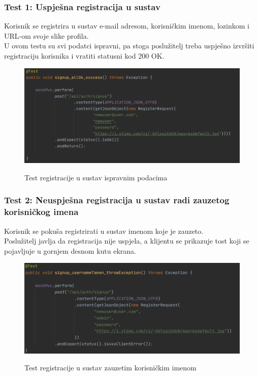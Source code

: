 			\subsubsection{Test 1: Uspješna registracija u sustav}
			Korisnik se registrira u sustav e-mail adresom, korisničkim imenom, lozinkom i URL-om svoje slike profila. \\
			U ovom testu su svi podatci ispravni, pa stoga poslužitelj treba uspješno izvršiti registraciju korisnika i vratiti statusni kod 200 OK.
			
			\begin{figure}[H]
				\centering
				\includegraphics[scale=0.75]{slike/test1} \\
				\caption{ Test registracije u sustav ispravnim podacima}
				\label{fig:test1}
			\end{figure}
		
		
			\subsubsection{Test 2: Neuspješna registracija u sustav radi zauzetog korisničkog imena}
			Korisnik se pokuša registrirati u sustav imenom koje je zauzeto. \\
			Poslužitelj javlja da registracija nije uspjela,
			a klijentu se prikazuje tost koji se pojavljuje u gornjem desnom kutu ekrana.
			
			\begin{figure}[H]
				\centering
				\includegraphics[scale=0.75]{slike/test2} \\
				\caption{ Test registracije u sustav zauzetim korisničkim imenom}
				\label{fig:test2}
			\end{figure}
		
